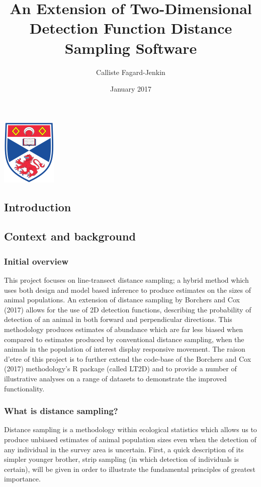 \documentclass[11pt]{article}
\title{An Extension of Two-Dimensional Detection Function Distance Sampling Software}
\date{January 2017}
\author{Calliste Fagard-Jenkin}
\begin{document}
\maketitle
\begin{center}
\includegraphics[scale=1]{Logo}
\end{center}
\newpage
\begin{multicols}{2}
	
\section{Introduction}
\subsection{Context and background}
\subsubsection{Initial overview}
This project focuses on line-transect distance sampling; a hybrid method which uses both design and model based inference to produce estimates on the sizes of animal populations. An extension of distance sampling by Borchers and Cox (2017) allows for the use of 2D detection functions, describing the probability of detection of an animal in both forward and perpendicular directions. This methodology produces estimates of abundance which are far less biased when compared to estimates produced by conventional distance sampling, when the animals in the population of interest display responsive movement. The raison d'etre of this project is to further extend the code-base of the Borchers and Cox (2017) methodology's R package (called LT2D) and to provide a number of illustrative analyses on a range of datasets to demonstrate the improved functionality.

\subsubsection{What is distance sampling?}

Distance sampling is a methodology within ecological statistics which allows us to produce unbiased estimates of animal population sizes even when the detection of any individual in the survey area is uncertain. First, a quick description of its simpler younger brother, strip sampling (in which detection of individuals is certain), will be given in order to illustrate the fundamental principles of greatest importance. 


\end{multicols}
\end{document}

